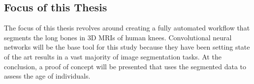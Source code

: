 \subsection{Focus of this Thesis}

The focus of this thesis revolves around creating a fully automated workflow that segments the long bones in 3D MRIs of human knees. Convolutional neural networks will be the base tool for this study because they have been setting state of the art results in a vast majority of image segmentation tasks. At the conclusion, a proof of concept will be presented that uses the segmented data to assess the age of individuals.

\newpage
